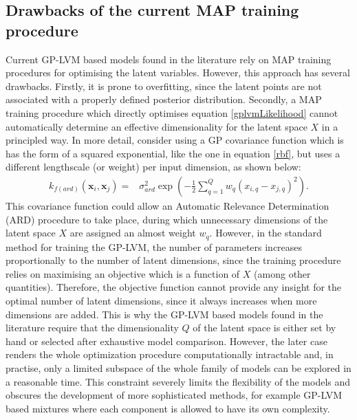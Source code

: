 \subsection{Drawbacks of the current MAP training procedure \label{mapCriticism}}

Current GP-LVM based models found in the literature rely on MAP training
procedures for optimising the latent variables. 
However, this approach has several drawbacks. Firstly, it 
is prone to overfitting, since the latent points are not associated with
a properly defined posterior distribution. 
Secondly, a MAP training procedure which directly optimises equation
\eqref{gplvmLikelihood} cannot automatically determine an effective dimensionality
for the latent space $X$ in a principled way. In more detail, consider using a GP
covariance function which is has the form of a squared exponential,
like the one in equation \eqref{rbf}, but uses 
a different lengthscale (or weight) per input dimension, as shown below:
\begin{align}
k_{f(ard)}  \left( \mathbf{x}_i, \mathbf{x}_j \right) = {} &  
		\sigma_{ard}^2 \exp \left(
			- \frac{1}{2} \sum_{q=1}^{Q} w_q \left(
                          \mathit{x_{i,q} - x_{j,q}} \right) ^2 \right).
\label{ard}
\end{align}
This covariance function could allow an Automatic Relevance Determination (ARD)
procedure to take place, during which unnecessary dimensions of the latent space
$X$ are assigned an almost weight $w_q$. 
However, in the standard method for training the
GP-LVM, the number of parameters increases proportionally to the number of latent
dimensions, since the training procedure relies on maximising an objective which is a
function of $X$ (among other quantities).
Therefore, the objective function cannot provide any insight for the optimal number of latent dimensions,
since it always increases when more dimensions are added.
This is why the GP-LVM based models found in the literature require that the
dimensionality $Q$ of the latent space is either set by hand or selected after exhaustive model
comparison. However, the later case renders the whole optimization procedure computationally intractable and, in practise,
only a limited subspace of the whole family of models can be explored in a reasonable time.
This constraint severely limits the flexibility of the models and obscures the development
of more sophisticated methods, for example GP-LVM based mixtures where each component
is allowed to have its own complexity. 

